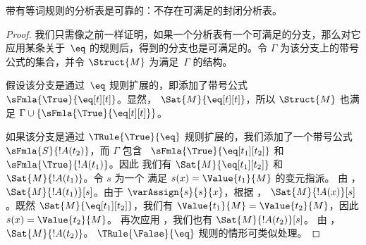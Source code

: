 \documentclass[../../../include/open-logic-section]{subfiles}
\begin{document}


\begin{prop}
带有等词规则的分析表是可靠的：不存在可满足的封闭分析表。
\end{prop}

\begin{proof}
我们只需像之前一样证明，如果一个分析表有一个可满足的分支，那么对它应用某条关于~$\eq$ 的规则后，得到的分支也是可满足的。令 $\Gamma$ 为该分支上的带号公式的集合，并令 $\Struct{M}$ 为满足~$\Gamma$ 的结构。

假设该分支是通过~$\eq$ 规则扩展的，即添加了带号公式~$\sFmla{\True}{\eq[t][t]}$。显然，
$\Sat{M}{\eq[t][t]}$，所以 $\Struct{M}$ 也满足 $\Gamma \cup
\{\sFmla{\True}{\eq[t][t]}\}$。

如果该分支是通过 $\TRule{\True}{\eq}$ 规则扩展的，我们添加了一个带号公式~$\sFmla{S}{!A(t_2)}$，而 $\Gamma$ 包含
~$\sFmla{\True}{\eq[t_1][t_2]}$ 和 $\sFmla{\True}{!A(t_1)}$。因此
我们有 $\Sat{M}{\eq[t_1][t_2]}$ 和 $\Sat{M}{!A(t_1)}$。令 $s$ 为一个
满足 $s(x) = \Value{t_1}{M}$ 的变元指派。
由 ，$\Sat{M}{!A(t_1)}[s]$。由于
$\varAssign{s}{s}{x}$，根据 ，
$\Sat{M}{!A(x)}[s]$。既然 $\Sat{M}{\eq[t_1][t_2]}$，我们有
$\Value{t_1}{M} = \Value{t_2}{M}$，因此 $s(x) = \Value{t_2}{M}$。
再次应用 ，我们也有
$\Sat{M}{!A(t_2)}[s]$。 由 ，
$\Sat{M}{!A(t_2)}$。 $\TRule{\False}{\eq}$ 规则的情形可类似处理。
\end{proof}
\end{document}
